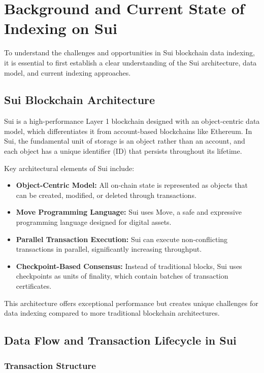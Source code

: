 \section{Background and Current State of Indexing on Sui}

To understand the challenges and opportunities in Sui blockchain data indexing, it is essential to first establish a clear understanding of the Sui architecture, data model, and current indexing approaches.

\subsection{Sui Blockchain Architecture}

Sui is a high-performance Layer 1 blockchain designed with an object-centric data model, which differentiates it from account-based blockchains like Ethereum. In Sui, the fundamental unit of storage is an object rather than an account, and each object has a unique identifier (ID) that persists throughout its lifetime.

Key architectural elements of Sui include:

\begin{itemize}
    \item \textbf{Object-Centric Model:} All on-chain state is represented as objects that can be created, modified, or deleted through transactions.
    \item \textbf{Move Programming Language:} Sui uses Move, a safe and expressive programming language designed for digital assets.
    \item \textbf{Parallel Transaction Execution:} Sui can execute non-conflicting transactions in parallel, significantly increasing throughput.
    \item \textbf{Checkpoint-Based Consensus:} Instead of traditional blocks, Sui uses checkpoints as units of finality, which contain batches of transaction certificates.
\end{itemize}

This architecture offers exceptional performance but creates unique challenges for data indexing compared to more traditional blockchain architectures.

\subsection{Data Flow and Transaction Lifecycle in Sui}

\subsubsection{Transaction Structure}

